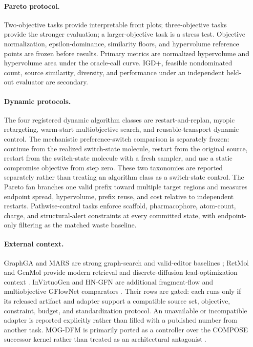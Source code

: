\paragraph{Pareto protocol.}
Two-objective tasks provide interpretable front plots; three-objective tasks
provide the stronger evaluation; a larger-objective task is a stress test.
Objective normalization, epsilon-dominance, similarity floors, and hypervolume
reference points are frozen before results. Primary metrics are normalized
hypervolume and hypervolume area under the oracle-call curve. IGD+, feasible
nondominated count, source similarity, diversity, and performance under an
independent held-out evaluator are secondary.

\paragraph{Dynamic protocols.}
The four registered dynamic algorithm classes are restart-and-replan, myopic
retargeting, warm-start multiobjective search, and reusable-transport dynamic
control. The mechanistic preference-switch comparison is separately frozen:
continue from the realized switch-state molecule, restart from the original
source, restart from the switch-state molecule with a fresh sampler, and use a
static compromise objective from step zero. These two taxonomies are reported
separately rather than treating an algorithm class as a switch-state control.
The Pareto fan branches one valid prefix toward multiple target regions and
measures endpoint spread, hypervolume, prefix reuse, and cost relative to
independent restarts. Pathwise-control tasks enforce scaffold, pharmacophore,
atom-count, charge, and structural-alert constraints at every committed state,
with endpoint-only filtering as the matched waste baseline.

\paragraph{External context.}
GraphGA and MARS are strong graph-search and valid-editor baselines
\citep{jensen2019graphga,xie2021mars}; RetMol and GenMol provide modern
retrieval and discrete-diffusion lead-optimization context
\citep{wang2023retmol,lee2025genmol}. InVirtuoGen and HN-GFN are additional
fragment-flow and multiobjective GFlowNet comparators
\citep{kaech2026invirtuogen,zhu2023hngfn}. Their rows are gated: each runs only
if its released artifact and adapter support a compatible source set,
objective, constraint, budget, and standardization protocol. An unavailable or
incompatible adapter is reported explicitly rather than filled with a
published number from another task. MOG-DFM is primarily ported as a controller
over the COMPOSE successor kernel rather than treated as an architectural
antagonist \citep{chen2025mogdfm}.

